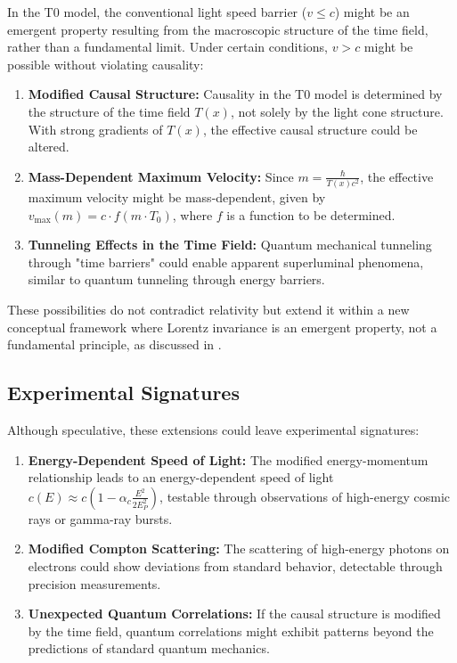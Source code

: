 \documentclass[12pt,a4paper]{article}
\newcommand{\Tfield}{T(x)}
\newcommand{\Tzero}{T_0}
\begin{document}
	In the T0 model, the conventional light speed barrier (\(v \leq c\)) might be an emergent property resulting from the macroscopic structure of the time field, rather than a fundamental limit. Under certain conditions, \(v > c\) might be possible without violating causality:
	
	\begin{enumerate}
		\item \textbf{Modified Causal Structure:} Causality in the T0 model is determined by the structure of the time field \(\Tfield\), not solely by the light cone structure. With strong gradients of \(\Tfield\), the effective causal structure could be altered.
		\item \textbf{Mass-Dependent Maximum Velocity:} Since \(m = \frac{\hbar}{\Tfield c^2}\), the effective maximum velocity might be mass-dependent, given by \(v_{\text{max}}(m) = c \cdot f(m \cdot \Tzero)\), where \(f\) is a function to be determined.
		\item \textbf{Tunneling Effects in the Time Field:} Quantum mechanical tunneling through "time barriers" could enable apparent superluminal phenomena, similar to quantum tunneling through energy barriers.
	\end{enumerate}
	
	These possibilities do not contradict relativity but extend it within a new conceptual framework where Lorentz invariance is an emergent property, not a fundamental principle, as discussed in \cite{pascher_zeit_masse_2025}.
	
	\subsection{Experimental Signatures}
	\label{subsec:experimental_signatures}
	
	Although speculative, these extensions could leave experimental signatures:
	
	\begin{enumerate}
		\item \textbf{Energy-Dependent Speed of Light:} The modified energy-momentum relationship leads to an energy-dependent speed of light \(c(E) \approx c (1 - \alpha_c \frac{E^2}{2E_P^2})\), testable through observations of high-energy cosmic rays or gamma-ray bursts.
		\item \textbf{Modified Compton Scattering:} The scattering of high-energy photons on electrons could show deviations from standard behavior, detectable through precision measurements.
		\item \textbf{Unexpected Quantum Correlations:} If the causal structure is modified by the time field, quantum correlations might exhibit patterns beyond the predictions of standard quantum mechanics.
	\end{enumerate}
	
\end{document}

